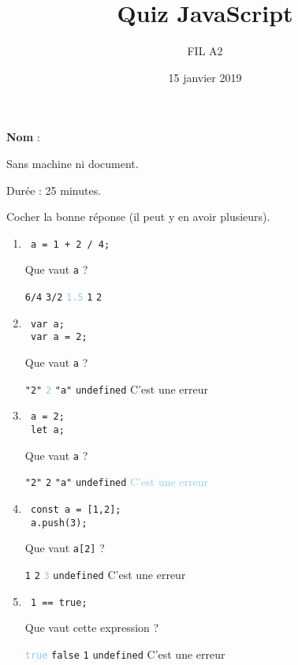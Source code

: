 \documentclass[a4paper, 12pt]{article}
\title{Quiz JavaScript}
\author{FIL A2}
\date{15 janvier 2019}
\newcommand{\choice}[1]{\Square\hspace{2pt} #1\hspace{5pt}}
\newcommand{\choicec}[1]{\Square\hspace{2pt} \lstinline{#1}\hspace{5pt}}
\newcommand{\halfpoint}[1]{\textcolor{SkyBlue}{#1}}
\newcommand{\choicegh}[1]{\halfpoint{\XBox\hspace{2pt} #1\hspace{5pt}}}
\newcommand{\choicecgh}[1]{\halfpoint{\XBox\hspace{2pt} \lstinline{#1}\hspace{5pt}}}
\begin{document}
\maketitle

\textbf{Nom} :

Sans machine ni document.

Durée : 25 minutes.

Cocher la bonne réponse (il peut y en avoir plusieurs).

\begin{enumerate}
\item \lstset{language=javascript}
\begin{lstlisting}
 a = 1 + 2 / 4;
\end{lstlisting}

  Que vaut \lstinline{a} ?

  \choicec{6/4} \choicec{3/2} \choicecgh{1.5} \choicec{1} \choicec{2}

\item \lstset{language=javascript}
\begin{lstlisting}
 var a;
 var a = 2;
\end{lstlisting}

  Que vaut \lstinline{a} ?

  \choicec{"2"} \choicecgh{2} \choicec{"a"} \choicec{undefined} \choice{C'est une erreur}
\item \lstset{language=javascript}
\begin{lstlisting}
 a = 2;
 let a;
\end{lstlisting}

  Que vaut \lstinline{a} ?

  \choicec{"2"} \choicec{2} \choicec{"a"} \choicec{undefined} \choicegh{C'est une erreur}
\item \lstset{language=javascript}
\begin{lstlisting}
 const a = [1,2];
 a.push(3);
\end{lstlisting}

  Que vaut \lstinline{a[2]} ?

  \choicec{1} \choicec{2} \choicecgh{3} \choicec{undefined} \choice{C'est une erreur}
\item \lstset{language=javascript}
\begin{lstlisting}
 1 == true;
\end{lstlisting}

  Que vaut cette expression ?

  \choicecgh{true} \choicec{false} \choicec{1} \choicec{undefined} \choice{C'est une erreur}


\end{enumerate}
\end{document}
